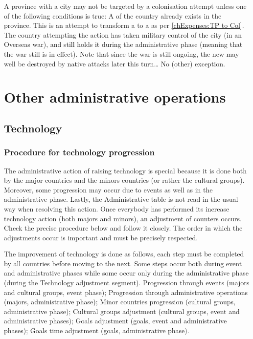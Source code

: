 \aparag[Cities] A province with a city may not be targeted by a colonisation
attempt unless one of the following conditions is true:
\bparag A \COL of the country already exists in the province.
\bparag This is an attempt to transform a \TP to a \COL as per
\ref{chExpenses:TP to Col}.
\bparag The country attempting the action has taken military control of the
city (in an Overseas war), and still holds it during the administrative phase
(meaning that the war still is in effect). Note that since the war is still
ongoing, the new \COL may well be destroyed by native attacks later this
turn\ldots
\bparag No (other) exception.





\section{Other administrative operations}



\subsection{Technology}\label{chExpenses:Technology}


\subsubsection{Procedure for technology progression}
\aparag The administrative action of raising technology is special because it
is done both by the major countries and the minors countries (or rather the
cultural groups). Moreover, some progression may occur due to events as well
as in the administrative phase. Lastly, the Administrative table is not read
in the usual way when resolving this action.
\bparag Once everybody has performed its increase technology action (both
majors and minors), an adjustment of counters occurs. Check the precise
procedure below and follow it closely. The order in which the adjustments
occur is important and must be precisely respected.

 The improvement of technology is done
as follows, each step must be completed by all countries before moving to the
next. Some steps occur both during event and administrative phases while some
occur only during the administrative phase (during the Technology adjustment
segment).
\bparag Progression through events (majors and cultural groups, event phase);
\bparag Progression through administrative operations (majors, administrative
phase);
\bparag Minor countries progression (cultural groups, administrative phase);
\bparag Cultural groups adjustment (cultural groups, event and administrative
phases);
\bparag Goals adjustment (goals, event and administrative phases);
\bparag Goals time adjustment (goals, administrative phase).

